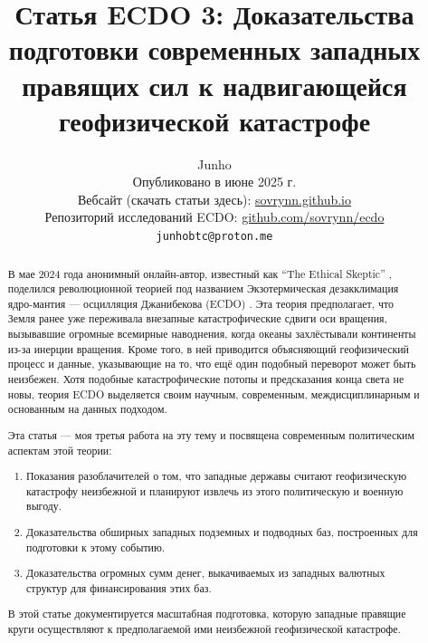 \documentclass[10pt,twocolumn,letterpaper]{article}
\begin{document}
\title{Статья ECDO 3: Доказательства подготовки современных западных правящих сил к надвигающейся геофизической катастрофе}

\author{Junho\\
Опубликовано в июне 2025 г.\\
Вебсайт (скачать статьи здесь): \href{https://sovrynn.github.io}{sovrynn.github.io}\\
Репозиторий исследований ECDO: \href{https://github.com/sovrynn/ecdo}{github.com/sovrynn/ecdo}\\
{\tt\small junhobtc@proton.me}
}

\maketitle

\begin{abstract}
В мае 2024 года анонимный онлайн-автор, известный как “The Ethical Skeptic” \cite{0}, поделился революционной теорией под названием Экзотермическая дезакклимация ядро-мантия — осцилляция Джанибекова (ECDO) \cite{1}. Эта теория предполагает, что Земля ранее уже переживала внезапные катастрофические сдвиги оси вращения, вызывавшие огромные всемирные наводнения, когда океаны захлёстывали континенты из-за инерции вращения. Кроме того, в ней приводится объясняющий геофизический процесс и данные, указывающие на то, что ещё один подобный переворот может быть неизбежен. Хотя подобные катастрофические потопы и предсказания конца света не новы, теория ECDO выделяется своим научным, современным, междисциплинарным и основанным на данных подходом.

Эта статья — моя третья работа \cite{2,3} на эту тему и посвящена современным политическим аспектам этой теории:
\begin{flushleft}
\begin{enumerate}
    \item Показания разоблачителей о том, что западные державы считают геофизическую катастрофу неизбежной и планируют извлечь из этого политическую и военную выгоду.
    \item Доказательства обширных западных подземных и подводных баз, построенных для подготовки к этому событию.
    \item Доказательства огромных сумм денег, выкачиваемых из западных валютных структур для финансирования этих баз.
\end{enumerate}
\end{flushleft}

В этой статье документируется масштабная подготовка, которую западные правящие круги осуществляют к предполагаемой ими неизбежной геофизической катастрофе.
\end{abstract}
\end{document}
